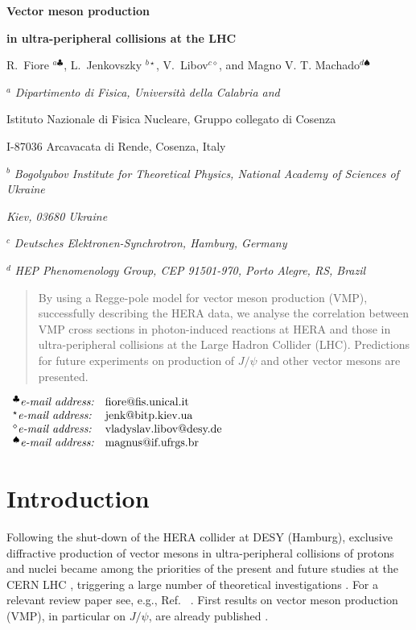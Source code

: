 \documentclass[12pt]{article}
\begin{document}
\vskip 0.5cm \centerline{\bf\Large Vector meson production}
\centerline{\bf\Large in ultra-peripheral collisions at the LHC}  \vskip 0.3cm
\centerline{R.~Fiore $^{a\clubsuit}$, L.~Jenkovszky $^{b\star}$, V.~Libov$^{c\diamond}$, and Magno V. T. Machado$^{d\spadesuit}$}

\vskip 1cm

\centerline{$^a$ \sl Dipartimento di Fisica, Universit\`a  della Calabria and}
\centerline{Istituto Nazionale di Fisica Nucleare, Gruppo collegato di Cosenza}
\centerline{I-87036 Arcavacata di Rende, Cosenza, Italy}
\centerline{$^b$ \sl Bogolyubov Institute for Theoretical Physics,
National Academy of Sciences of Ukraine} \centerline{\sl Kiev,
03680 Ukraine}
\centerline{$^c$ \sl Deutsches Elektronen-Synchrotron, Hamburg, Germany}
\centerline{$^d$ \sl HEP Phenomenology Group, CEP 91501-970, Porto Alegre, RS, Brazil}
\vskip
0.1cm

\begin{abstract}\noindent
By using a Regge-pole model for vector meson production (VMP), successfully describing the HERA data, we analyse the correlation between VMP cross sections in photon-induced reactions at HERA and those in ultra-peripheral collisions at the Large Hadron Collider (LHC).
Predictions for future experiments on production of $J/\psi$ and other vector mesons are presented.
\end{abstract}

\vskip 0.1cm

$
\begin{array}{ll}
^{\clubsuit}\mbox{{\it e-mail address:}} &
\mbox{fiore@fis.unical.it}\\
^{\star}\mbox{{\it e-mail address:}} &
   \mbox{jenk@bitp.kiev.ua} \\
^{\diamond}\mbox{{\it e-mail address:}} &
   \mbox{vladyslav.libov@desy.de} \\
 ^{\spadesuit}\mbox{{\it e-mail address:}} &
\mbox{magnus@if.ufrgs.br}\\  

\end{array}
$


\section{Introduction}\label{Int}

Following the shut-down of the HERA collider at DESY (Hamburg), exclusive diffractive production of vector mesons in ultra-peripheral collisions of protons and nuclei became among the priorities of the present and future studies at the CERN LHC \cite{LHCb1, LHCb2, LHC_ATLAS}, triggering a large number of theoretical investigations \cite{Schafer, Brazil, Ryskin, Motyka, Szczurek}.
For a relevant review paper see, e.g., Ref.~ \cite{Review}.
First results on vector meson production (VMP), in particular on $J/\psi$, are already published \cite{LHCb1, LHCb2}.
\end{document}
